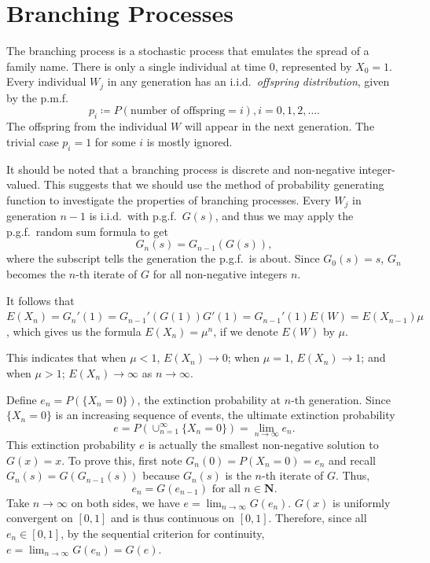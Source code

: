 \documentclass[11pt]{article}
\newcommand{\N}{\mathbf{N}}
\begin{document}


\section{Branching Processes}

The branching process is a stochastic process that emulates the spread of a family name. There is only a single individual at time 0, represented by $X_{0}=1$. Every individual $W_{j}$ in any generation has an i.i.d.\ \textit{offspring distribution}, given by the p.m.f.
\[
p_{i}\coloneqq P(\text{number of offspring}=i),i=0,1,2,\dots .
\]
The offspring from the individual $W$ will appear in the next generation. The trivial case 
$p_{i}=1$ for some $i$ is mostly ignored.

It should be noted that a branching process is discrete and non-negative integer-valued. This suggests that we should use the method of probability generating function to investigate the properties of branching processes. Every $W_{j}$ in generation $n- 1$ is i.i.d.\ with p.g.f.\ $G(s)$, and thus we may apply the p.g.f.\ random sum formula to get
\[
G_{n}(s)=G_{n-1}(G(s)),
\]
where the subscript tells the generation the p.g.f.\ is about. Since $G_{0}(s)=s$, $G_{n}$ becomes the $n$-th iterate of $G$ for all non-negative integers $n$.

It follows that $E(X_{n})=G_{n}'(1)=G_{n- 1}'(G(1))G'(1)=G_{n- 1}'(1)E(W)=E(X_{n- 1})\mu $, which gives us the formula $E(X_{n})=\mu ^{n}$, if we denote $E(W)$ by $\mu $.

This indicates that when $\mu <1$, $E(X_{n})\rightarrow 0$; when $\mu =1$, $E(X_{n})\rightarrow 1$; and when $\mu >1$; $E(X_{n})\rightarrow \infty $ as $n\rightarrow \infty $.

Define $e_{n}=P(\{X_{n}=0\})$, the extinction probability at $n$-th generation. Since $\{X_{n}=0\}$ is an increasing sequence of events, the ultimate extinction probability
\[
e=P(\cup _{n=1}^{\infty }\{X_{n}=0\})=\lim _{n \to \infty }e_{n}.
\]
This extinction probability $e$ is actually the smallest non-negative solution to $G(x)=x$. To prove this, first note $G_{n}(0)=P(X_{n}=0)=e_{n}$ and recall $G_{n}(s)=G(G_{n- 1}(s))$ because $G_{n}(s)$ is the $n$-th iterate of $G$. Thus,
\[
e_{n}=G(e_{n- 1}) \text{ for all } n\in \N .
\]
Take $n\rightarrow \infty $ on both sides, we have $e=\lim _{n\rightarrow \infty }G(e_{n})$. $G(x)$ is uniformly convergent on 
$[0,1]$ and is thus continuous on $[0,1]$. Therefore, since all $e_{n}\in [0,1]$, by the sequential criterion for continuity, $e=\lim _{n\rightarrow \infty }G(e_{n})=G(e)$.
\end{document}
